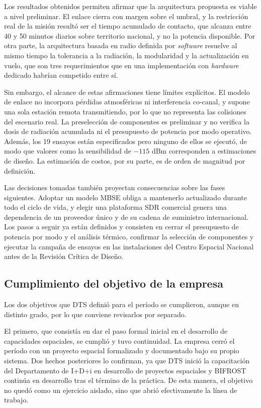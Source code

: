 Los resultados obtenidos permiten afirmar que la arquitectura propuesta es viable a nivel preliminar. El enlace cierra con margen sobre el umbral, y la restricción real de la misión resultó ser el tiempo acumulado de contacto, que alcanza entre 40 y 50 minutos diarios sobre territorio nacional, y no la potencia disponible. Por otra parte, la arquitectura basada en radio definida por \textit{software} resuelve al mismo tiempo la tolerancia a la radiación, la modularidad y la actualización en vuelo, que son tres requerimientos que en una implementación con \textit{hardware} dedicado habrían competido entre sí.

Sin embargo, el alcance de estas afirmaciones tiene límites explícitos. El modelo de enlace no incorpora pérdidas atmosféricas ni interferencia co-canal, y supone una sola estación remota transmitiendo, por lo que no representa las colisiones del escenario real. La preselección de componentes es preliminar y no verifica la dosis de radiación acumulada ni el presupuesto de potencia por modo operativo. Además, los 19 ensayos están especificados pero ninguno de ellos se ejecutó, de modo que valores como la sensibilidad de $-115$ dBm corresponden a estimaciones de diseño. La estimación de costos, por su parte, es de orden de magnitud por definición.

Las decisiones tomadas también proyectan consecuencias sobre las fases siguientes. Adoptar un modelo MBSE obliga a mantenerlo actualizado durante todo el ciclo de vida, y elegir una plataforma SDR comercial genera una dependencia de un proveedor único y de su cadena de suministro internacional. Los pasos a seguir ya están definidos y consisten en cerrar el presupuesto de potencia por modo y el análisis térmico, confirmar la selección de componentes y ejecutar la campaña de ensayos en las instalaciones del Centro Espacial Nacional antes de la Revisión Crítica de Diseño.


\subsection{Cumplimiento del objetivo de la empresa}

Los dos objetivos que DTS definió para el período se cumplieron, aunque en distinto grado, por lo que conviene revisarlos por separado.

El primero, que consistía en dar el paso formal inicial en el desarrollo de capacidades espaciales, se cumplió y tuvo continuidad. La empresa cerró el período con un proyecto espacial formalizado y documentado bajo su propio sistema. Dos hechos posteriores lo confirman, ya que DTS inició la capacitación del Departamento de I+D+i en desarrollo de proyectos espaciales y BIFROST continúa en desarrollo tras el término de la práctica. De esta manera, el objetivo no quedó como un ejercicio aislado, sino que abrió efectivamente la línea de trabajo.

